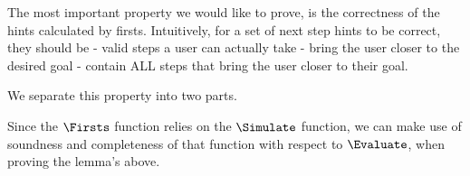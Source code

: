 The most important property we would like to prove, is the correctness of the hints calculated by firsts.
Intuitively, for a set of next step hints to be correct, they should be
- valid steps a user can actually take
- bring the user closer to the desired goal
- contain ALL steps that bring the user closer to their goal.

We separate this property into two parts.


\begin{lemma}
  \label{lem:soundfirsts}

\end{lemma}


\begin{lemma}
  \label{lem:completefirsts}

\end{lemma}


Since the $\Firsts$ function relies on the $\Simulate$ function, we can make use of soundness and completeness of that function with respect to $\Evaluate$, when proving the lemma's above.

\begin{lemma}
  \label{lem:soundsimulate}
\end{lemma}

\begin{lemma}
  \label{lem:completesimulate}
\end{lemma}


